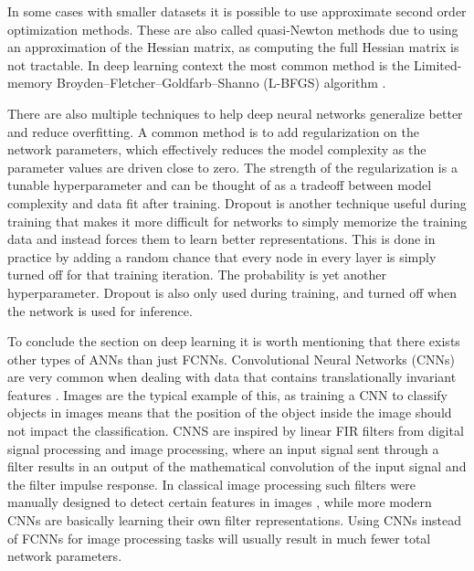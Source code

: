 In some cases with smaller datasets it is possible to use approximate second order optimization methods. These are also called quasi-Newton methods due to using an approximation of the Hessian matrix, as computing the full Hessian matrix is not tractable. In deep learning context the most common method is the Limited-memory Broyden–Fletcher–Goldfarb–Shanno (L-BFGS) algorithm \cite{numericaloptimization}.

There are also multiple techniques to help deep neural networks generalize better and reduce overfitting. A common method is to add regularization on the network parameters, which effectively reduces the model complexity as the parameter values are driven close to zero. The strength of the regularization is a tunable hyperparameter and can be thought of as a tradeoff between model complexity and data fit after training. Dropout is another technique useful during training that makes it more difficult for networks to simply memorize the training data and instead forces them to learn better representations. This is done in practice by adding a random chance that every node in every layer is simply turned off for that training iteration. The probability is yet another hyperparameter. Dropout is also only used during training, and turned off when the network is used for inference.

To conclude the section on deep learning it is worth mentioning that there exists other types of ANNs than just FCNNs. Convolutional Neural Networks (CNNs) are very common when dealing with data that contains translationally invariant features \cite{deeplearningnature}. Images are the typical example of this, as training a CNN to classify objects in images means that the position of the object inside the image should not impact the classification. CNNS are inspired by linear FIR filters from digital signal processing and image processing, where an input signal sent through a filter results in an output of the mathematical convolution of the input signal and the filter impulse response. In classical image processing such filters were manually designed to detect certain features in images \cite{imageprocessing}, while more modern CNNs are basically learning their own filter representations. Using CNNs instead of FCNNs for image processing tasks will usually result in much fewer total network parameters.


